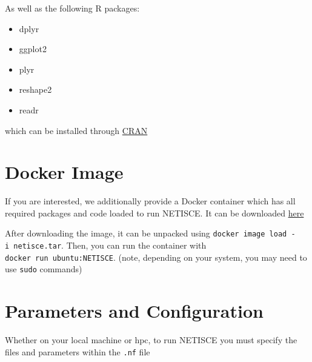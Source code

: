 \documentclass[
]{book}
\providecommand{\tightlist}{%
  \setlength{\itemsep}{0pt}\setlength{\parskip}{0pt}}
\begin{document}
As well as the following R packages:

\begin{itemize}
\tightlist
\item
  dplyr
\item
  ggplot2
\item
  plyr
\item
  reshape2
\item
  readr
\end{itemize}

which can be installed through \href{https://cran.r-project.org/}{CRAN}

\hypertarget{docker-image}{%
\section{Docker Image}\label{docker-image}}

If you are interested, we additionally provide a Docker container which has all required packages and code loaded to run NETISCE. It can be downloaded \href{https://www.dropbox.com/sh/8ix62io5axlq479/AADf8asm1hfxNZhXHqJoahoGa?dl=0}{here}

After downloading the image, it can be unpacked using \texttt{docker\ image\ load\ -i\ netisce.tar}. Then, you can run the container with \texttt{docker\ run\ ubuntu:NETISCE}. (note, depending on your system, you may need to use \texttt{sudo} commands)

\hypertarget{params}{%
\section{Parameters and Configuration}\label{params}}

Whether on your local machine or hpc, to run NETISCE you must specify the files and parameters within the \texttt{.nf} file
\end{document}
